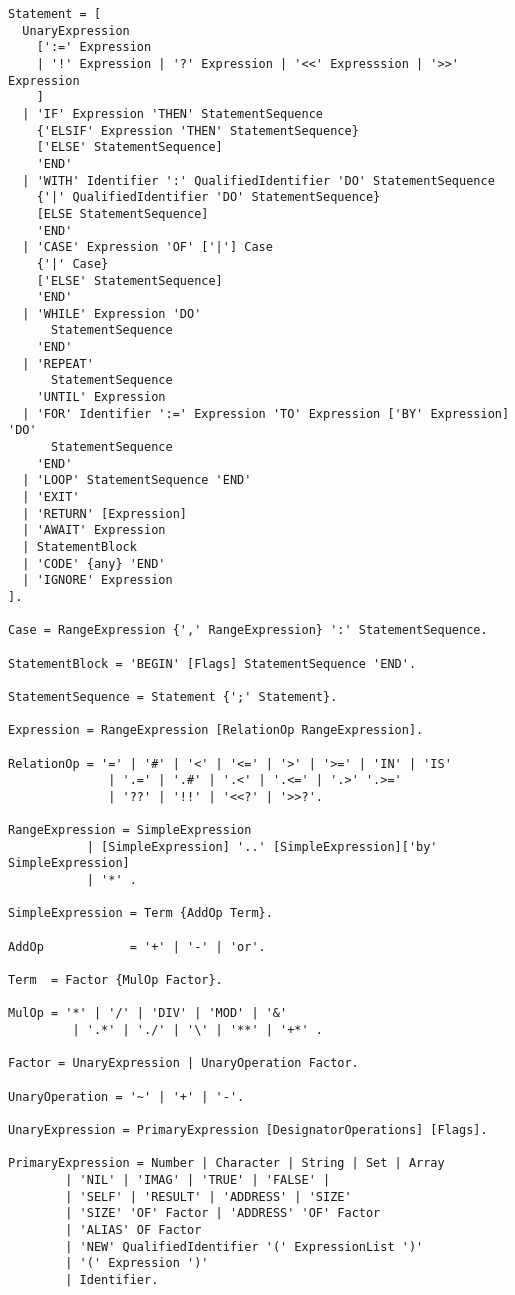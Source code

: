 \documentclass[a4wide,11pt]{article}
\begin{document}
\begin{lstlisting}[style=EBNF]
Statement = [
  UnaryExpression 
    [':=' Expression 
    | '!' Expression | '?' Expression | '<<' Expresssion | '>>' Expression
    ]
  | 'IF' Expression 'THEN' StatementSequence
    {'ELSIF' Expression 'THEN' StatementSequence}
    ['ELSE' StatementSequence]
    'END'
  | 'WITH' Identifier ':' QualifiedIdentifier 'DO' StatementSequence
    {'|' QualifiedIdentifier 'DO' StatementSequence}
    [ELSE StatementSequence]
    'END'
  | 'CASE' Expression 'OF' ['|'] Case 
    {'|' Case} 
    ['ELSE' StatementSequence] 
    'END'
  | 'WHILE' Expression 'DO' 
      StatementSequence 
    'END'
  | 'REPEAT' 
      StatementSequence 
    'UNTIL' Expression
  | 'FOR' Identifier ':=' Expression 'TO' Expression ['BY' Expression] 'DO'
      StatementSequence 
    'END'
  | 'LOOP' StatementSequence 'END'
  | 'EXIT'
  | 'RETURN' [Expression]
  | 'AWAIT' Expression
  | StatementBlock 
  | 'CODE' {any} 'END'
  | 'IGNORE' Expression  
].

Case = RangeExpression {',' RangeExpression} ':' StatementSequence.	

StatementBlock = 'BEGIN' [Flags] StatementSequence 'END'.

StatementSequence = Statement {';' Statement}.

Expression = RangeExpression [RelationOp RangeExpression].

RelationOp = '=' | '#' | '<' | '<=' | '>' | '>=' | 'IN' | 'IS'
              | '.=' | '.#' | '.<' | '.<=' | '.>' '.>='
              | '??' | '!!' | '<<?' | '>>?'.

RangeExpression = SimpleExpression
           | [SimpleExpression] '..' [SimpleExpression]['by' SimpleExpression]
           | '*' .

SimpleExpression = Term {AddOp Term}.

AddOp            = '+' | '-' | 'or'.

Term  = Factor {MulOp Factor}.

MulOp = '*' | '/' | 'DIV' | 'MOD' | '&'
         | '.*' | './' | '\' | '**' | '+*' .

Factor = UnaryExpression | UnaryOperation Factor.

UnaryOperation = '~' | '+' | '-'.

UnaryExpression = PrimaryExpression [DesignatorOperations] [Flags].

PrimaryExpression = Number | Character | String | Set | Array
        | 'NIL' | 'IMAG' | 'TRUE' | 'FALSE' |
        | 'SELF' | 'RESULT' | 'ADDRESS' | 'SIZE' 
        | 'SIZE' 'OF' Factor | 'ADDRESS' 'OF' Factor
        | 'ALIAS' OF Factor
        | 'NEW' QualifiedIdentifier '(' ExpressionList ')'
        | '(' Expression ')'
        | Identifier.


\end{lstlisting}
\end{document}
